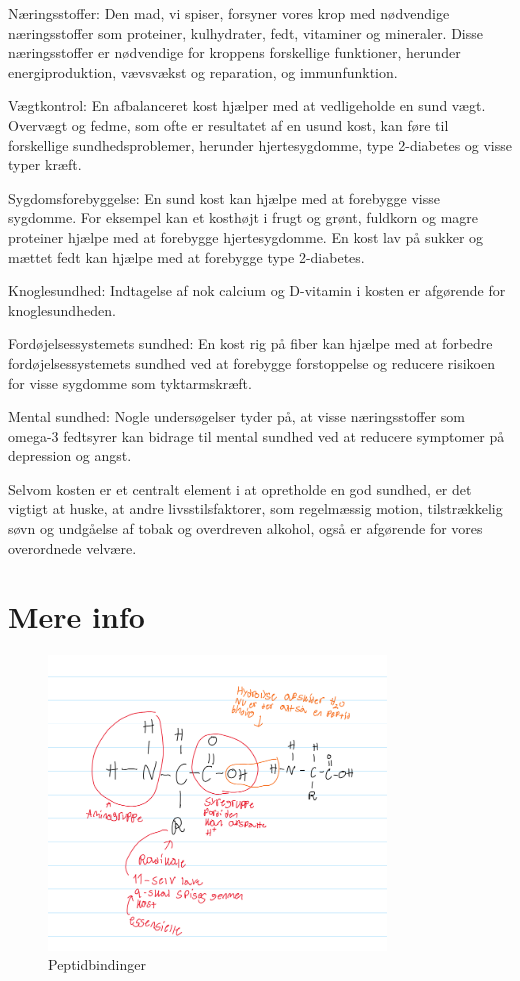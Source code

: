     Næringsstoffer: Den mad, vi spiser, forsyner vores krop med nødvendige næringsstoffer som proteiner, kulhydrater, fedt, vitaminer og mineraler. Disse næringsstoffer er nødvendige for kroppens forskellige funktioner, herunder energiproduktion, vævsvækst og reparation, og immunfunktion.

    Vægtkontrol: En afbalanceret kost hjælper med at vedligeholde en sund vægt. Overvægt og fedme, som ofte er resultatet af en usund kost, kan føre til forskellige sundhedsproblemer, herunder hjertesygdomme, type 2-diabetes og visse typer kræft.

    Sygdomsforebyggelse: En sund kost kan hjælpe med at forebygge visse sygdomme. For eksempel kan et kosthøjt i frugt og grønt, fuldkorn og magre proteiner hjælpe med at forebygge hjertesygdomme. En kost lav på sukker og mættet fedt kan hjælpe med at forebygge type 2-diabetes.

    Knoglesundhed: Indtagelse af nok calcium og D-vitamin i kosten er afgørende for knoglesundheden.

    Fordøjelsessystemets sundhed: En kost rig på fiber kan hjælpe med at forbedre fordøjelsessystemets sundhed ved at forebygge forstoppelse og reducere risikoen for visse sygdomme som tyktarmskræft.

    Mental sundhed: Nogle undersøgelser tyder på, at visse næringsstoffer som omega-3 fedtsyrer kan bidrage til mental sundhed ved at reducere symptomer på depression og angst.

    Selvom kosten er et centralt element i at opretholde en god sundhed, er det vigtigt at huske, at andre livsstilsfaktorer, som regelmæssig motion, tilstrækkelig søvn og undgåelse af tobak og overdreven alkohol, også er afgørende for vores overordnede velvære.
\section*{Mere info}
\begin{figure}[h]
    \centering
    \includegraphics[width=0.8\textwidth]{figurs/peptidbindinger.png}
    \caption{Peptidbindinger}
    \label{fig:peptidbindinger}
\end{figure}